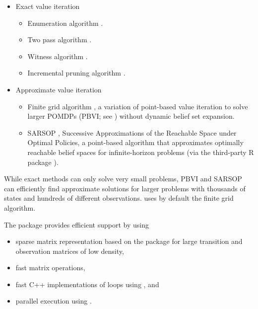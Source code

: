 \begin{itemize}
\tightlist
\item
  Exact value iteration

  \begin{itemize}
  \tightlist
  \item
    Enumeration algorithm \citep{Sondik1971, Monahan1982}.
  \item
    Two pass algorithm \citep{Sondik1971}.
  \item
    Witness algorithm \citep{Littman1995}.
  \item
    Incremental pruning algorithm \citep{Zhang1996, Cassandra1997}.
  \end{itemize}
\item
  Approximate value iteration

  \begin{itemize}
  \tightlist
  \item
    Finite grid algorithm \citep{Cassandra2015}, a variation of point-based value iteration to solve larger POMDPs (PBVI; see \citep{Pineau2003}) without dynamic belief set expansion.
  \item
    SARSOP \citep{Kurniawati2008}, Successive Approximations of the
    Reachable Space under Optimal Policies, a point-based algorithm
    that approximates optimally reachable belief spaces for
    infinite-horizon problems (via the third-party
    R package  \citep{Bottiger2021}).
  \end{itemize}
\end{itemize}

While exact methods can only solve very small problems, PBVI and
SARSOP can efficiently find approximate solutions for larger
problems with thousands of states and hundreds of different
observations.  uses by default the finite grid
algorithm.

The  package provides efficient support by using

\begin{itemize}
\tightlist
\item
  sparse matrix representation based on the  package \citep{Bates2022} for large transition and observation
  matrices of low density,
\item
  fast matrix operations,
\item
  fast C++ implementations of loops using  \citep{Eddelbuettel2013}, and
\item
  parallel execution using  \citep{Microsoft2022}.
\end{itemize}

